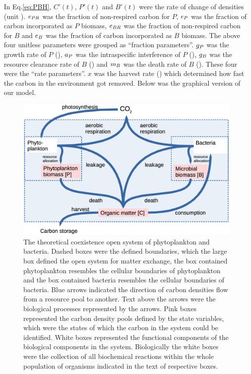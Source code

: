 \documentclass[../thesis.tex]{subfiles} %
\begin{document}
In Eq.\ref{eq:PBH}, $C'(t)$, $P'(t)$ and $B'(t)$ were the rate of change of densities (unit \dxdt).  $e_{PR}$ was the fraction of non-respired carbon for $P$, $e_P$ was the fraction of carbon incorporated as $P$ biomass, $e_{BR}$ was the fraction of non-respired carbon for $B$ and $e_B$ was the fraction of carbon incorporated as $B$ biomass.  The above four unitless parameters were grouped as “fraction parameters”.  $g_P$ was the growth rate of $P$ (\dayU), $a_P$ was the intraspecific interference of $P$ (\denI), $g_B$ was the resource clearance rate of $B$  (\denI) and $m_B$ was the death rate of $B$ (\dayU).  These four were the “rate parameters”.  $x$ was the harvest rate (\dayU) which determined how fast the carbon in the environment got removed.  Below was the graphical version of our model.

\begin{figure}[H]
    \centering
    \includegraphics[width=.8\linewidth]{media/model.png}
    \caption[Model visualization]{The theoretical coexistence open system of phytoplankton and bacteria.  Dashed boxes were the defined boundaries, which the large box defined the open system for matter exchange, the box contained phytoplankton resembles the cellular boundaries of phytoplankton and the box contained bacteria resembles the cellular boundaries of bacteria.  Blue arrows indicated the direction of carbon densities flow from a resource pool to another.  Text above the arrows were the biological processes represented by the arrows.  Pink boxes represented the carbon density pools defined by the state variables, which were the states of which the carbon in the system could be identified.  White boxes represented the functional components of the biological components in the system.  Biologically the white boxes were the collection of all biochemical reactions within the whole population of organisms indicated in the text of respective boxes.}
    \label{f:model}
\end{figure}
\end{document}
